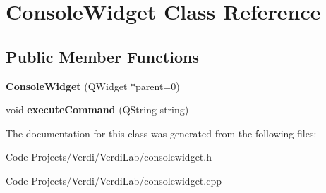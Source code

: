 \hypertarget{class_console_widget}{\section{\-Console\-Widget \-Class \-Reference}
\label{class_console_widget}
}
\subsection*{\-Public \-Member \-Functions}
\begin{DoxyCompactItemize}
\item 
\hypertarget{class_console_widget_a4a66caaf3f7583a46ebe44a5c2221160}{{\bfseries \-Console\-Widget} (\-Q\-Widget $\ast$parent=0)}\label{class_console_widget_a4a66caaf3f7583a46ebe44a5c2221160}

\item 
\hypertarget{class_console_widget_a5756adf954f54c6e075792947ab68c43}{void {\bfseries execute\-Command} (\-Q\-String string)}\label{class_console_widget_a5756adf954f54c6e075792947ab68c43}

\end{DoxyCompactItemize}


\-The documentation for this class was generated from the following files\-:\begin{DoxyCompactItemize}
\item 
\-Code Projects/\-Verdi/\-Verdi\-Lab/consolewidget.\-h\item 
\-Code Projects/\-Verdi/\-Verdi\-Lab/consolewidget.\-cpp\end{DoxyCompactItemize}
